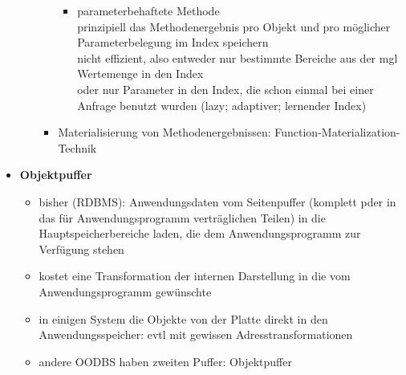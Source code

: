 \begin{itemize}
\begin{itemize}
\begin{itemize}
\begin{itemize}
				\item parameterbehaftete Methode\\
				prinzipiell das Methodenergebnis pro Objekt und pro möglicher Parameterbelegung im Index speichern\\
				nicht effizient, also entweder nur bestimmte Bereiche aus der mgl Wertemenge in den Index\\
				oder nur Parameter in den Index, die schon einmal bei einer Anfrage benutzt wurden (lazy; adaptiver; lernender Index)
			\end{itemize}
			
			\item Materialisierung von Methodenergebnissen: Function-Materialization-Technik
		\end{itemize}
	\end{itemize}
	\item \textbf{Objektpuffer}
	\begin{itemize}
		\item bisher (RDBMS): Anwendungsdaten vom Seitenpuffer (komplett pder in das für Anwendungsprogramm verträglichen Teilen) in die Hauptspeicherbereiche laden, die dem Anwendungsprogramm zur Verfügung stehen
		\item kostet eine Transformation der internen Darstellung in die vom Anwendungsprogramm gewünschte
		\item in einigen System die Objekte von der Platte direkt in den Anwendungsspeicher: evtl mit gewissen Adresstransformationen
		\item andere OODBS haben zweiten Puffer: Objektpuffer
	\end{itemize}
	

\end{itemize}
